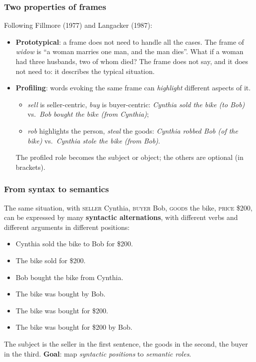 \subsubsection{Two properties of frames}

Following Fillmore (1977) and Langacker (1987):

\begin{itemize}
  \item \textbf{Prototypical}: a frame does not need to handle all the cases. The frame
        of \emph{widow} is ``a woman marries one man, and the man dies''. What if a woman
        had three husbands, two of whom died? The frame does not say, and it does not
        need to: it describes the typical situation.
  \item \textbf{Profiling}: words evoking the same frame can \emph{highlight} different
        aspects of it.
        \begin{itemize}[nosep]
          \item \emph{sell} is seller-centric, \emph{buy} is buyer-centric:
                \emph{Cynthia sold the bike (to Bob)} vs.\ \emph{Bob bought the bike
                (from Cynthia)};
          \item \emph{rob} highlights the person, \emph{steal} the goods:
                \emph{Cynthia robbed Bob (of the bike)} vs.\ \emph{Cynthia stole the bike
                (from Bob)}.
        \end{itemize}
        The profiled role becomes the subject or object; the others are optional (in
        brackets).
\end{itemize}

\subsubsection{From syntax to semantics}

The same situation, with \textsc{seller} Cynthia, \textsc{buyer} Bob, \textsc{goods} the
bike, \textsc{price} \$200, can be expressed by many \textbf{syntactic alternations},
with different verbs and different arguments in different positions:
\begin{itemize}[nosep]
  \item Cynthia sold the bike to Bob for \$200.
  \item The bike sold for \$200.
  \item Bob bought the bike from Cynthia.
  \item The bike was bought by Bob.
  \item The bike was bought for \$200.
  \item The bike was bought for \$200 by Bob.
\end{itemize}
The subject is the seller in the first sentence, the goods in the second, the buyer in
the third. \textbf{Goal}: map \emph{syntactic positions} to \emph{semantic roles}.

